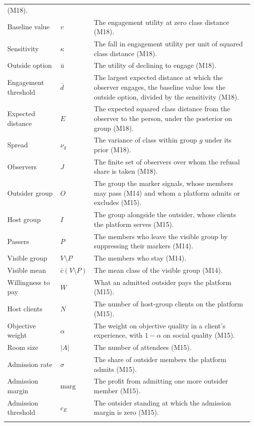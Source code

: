\begin{longtable}{@{}P{3.4cm}P{4.2cm}P{8.6cm}@{}}
  (M18). \\ \addlinespace
Baseline value & $v$ & The engagement utility at zero class distance
  (M18). \\ \addlinespace
Sensitivity & $\kappa$ & The fall in engagement utility per unit of squared
  class distance (M18). \\ \addlinespace
Outside option & $\bar u$ & The utility of declining to engage (M18). \\
  \addlinespace
Engagement threshold & $\bar d$ & The largest expected distance at which the
  observer engages, the baseline value less the outside option, divided by
  the sensitivity (M18). \\ \addlinespace
Expected distance & $E$ & The expected squared class distance from the
  observer to the person, under the posterior on group (M18). \\
  \addlinespace
Spread & $\nu_g$ & The variance of class within group $g$ under its prior
  (M18). \\ \addlinespace
Observers & $J$ & The finite set of observers over whom the refusal share is
  taken (M18). \\ \addlinespace
Outsider group & $O$ & The group the marker signals, whose members may pass
  (M14) and whom a platform admits or excludes (M15). \\ \addlinespace
Host group & $I$ & The group alongside the outsider, whose clients the
  platform serves (M15). \\ \addlinespace
Passers & $P$ & The members who leave the visible group by suppressing
  their markers (M14). \\ \addlinespace
Visible group & $V\setminus P$ & The members who stay (M14). \\
  \addlinespace
Visible mean & $\bar c(V\setminus P)$ & The mean class of the visible group
  (M14). \\ \addlinespace
Willingness to pay & $W$ & What an admitted outsider pays the platform
  (M15). \\ \addlinespace
Host clients & $N$ & The number of host-group clients on the platform
  (M15). \\ \addlinespace
Objective weight & $\alpha$ & The weight on objective quality in a client's
  experience, with $1-\alpha$ on social quality (M15). \\ \addlinespace
Room size & $|A|$ & The number of attendees (M15). \\ \addlinespace
Admission rate & $\sigma$ & The share of outsider members the platform
  admits (M15). \\ \addlinespace
Admission margin & $\mathrm{marg}$ & The profit from admitting one more
  outsider member (M15). \\ \addlinespace
Admission threshold & $c_E$ & The outsider standing at which the admission
  margin is zero (M15). \\ \addlinespace
\end{longtable}
\normalsize

